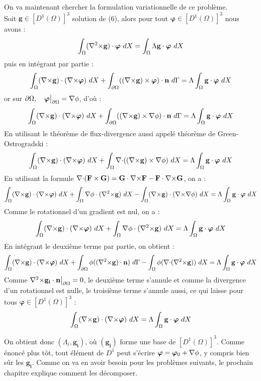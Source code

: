 On va maintenant chercher la formulation variationnelle de ce problème.\\
Soit $\mathbf{g}\in [D^1(\Omega)]^3$ solution de (6), alors pour tout $\bm{\varphi}\in [D^1(\Omega)]^3$ nous avons :
\[ \int_\Omega ({\nabla^2\times} \mathbf{g})\cdot\bm{\varphi}\ dX = \int_\Omega\Lambda \mathbf{g}\cdot\bm{\varphi}\ dX \]
puis en intégrant par partie :
\[ \int_\Omega ({\nabla\times} \mathbf{g})\cdot({\nabla\times}\bm{\varphi})\ dX + \int_{\partial\Omega} (({\nabla\times} \mathbf{g})\times \bm{\varphi})\cdot \mathbf{n}\ d\Gamma = \Lambda\int_\Omega \mathbf{g}\cdot\bm{\varphi}\ dX \]
or sur $\partial\Omega,\quad \bm{\varphi}{\big\rvert_{\partial\Omega}}={\nabla}\phi$, d'où :
\[ \int_\Omega ({\nabla\times} \mathbf{g})\cdot({\nabla\times}\bm{\varphi})\ dX + \int_{\partial\Omega} (({\nabla\times} \mathbf{g})\times {\nabla}\phi)\cdot \mathbf{n}\ d\Gamma = \Lambda\int_\Omega \mathbf{g}\cdot\bm{\varphi}\ dX \]
En utilisant le théorème de flux-divergence aussi appelé théorème de Green-Ostrogradski :
\[ \int_\Omega ({\nabla\times} \mathbf{g})\cdot({\nabla\times}\bm{\varphi})\ dX + \int_\Omega {\nabla\cdot}(({\nabla\times} \mathbf{g})\times {\nabla}\phi)\ dX = \Lambda\int_\Omega \mathbf{g}\cdot\bm{\varphi}\ dX \]
En utilisant la formule ${\nabla\cdot}(\mathbf{F}\times \mathbf{G}) = \mathbf{G}\cdot {\nabla\times} \mathbf{F} - \mathbf{F}\cdot {\nabla\times} \mathbf{G}$, on a :
\[ \int_\Omega (\rot \mathbf{g})\cdot(\rot\bm{\varphi})\ dX + \int_\Omega \grad\phi\cdot(\rott \mathbf{g})\ dX -\int_\Omega (\rot \mathbf{g})\cdot (\rot\grad\phi)\ dX  = \Lambda\int_\Omega \mathbf{g}\cdot\bm{\varphi}\ dX \]
Comme le rotationnel d'un gradient est nul, on a :
\[ \int_\Omega ({\nabla\times} \mathbf{g})\cdot({\nabla\times}\bm{\varphi})\ dX + \int_\Omega {\nabla}\phi\cdot({\nabla^2\times} \mathbf{g})\ dX  = \Lambda\int_\Omega \mathbf{g}\cdot\bm{\varphi}\ dX \]
En intégrant le deuxième terme par partie, on obtient :
\[ \int_\Omega ({\nabla\times} \mathbf{g})\cdot({\nabla\times}\bm{\varphi})\ dX + \int_{\partial\Omega} \phi(({\nabla^2\times} \mathbf{g})\cdot \mathbf{n})\ d\Gamma - \int_\Omega \phi({\nabla\cdot}({\nabla^2\times} \mathbf{g}))\ dX  = \Lambda\int_\Omega \mathbf{g}\cdot\bm{\varphi}\ dX \]
Comme ${\nabla^2\times}  \mathbf{g_i}\cdot \mathbf{n}{\big\rvert_{\partial\Omega}} = 0$, le deuxième terme s'annule et comme la divergence d'un rotationnel est nulle, le troisième terme s'annule aussi, ce qui laisse pour tous $\bm{\varphi}\in [D^1(\Omega)]^3$ :
\begin{equation}\label{fveigen}
\int_\Omega ({\nabla\times} \mathbf{g})\cdot({\nabla\times}\bm{\varphi})\ dX = \Lambda\int_\Omega \mathbf{g}\cdot\bm{\varphi}\ dX
\end{equation}

On obtient donc $(\Lambda_i,\mathbf{g_i})$, où $(\mathbf{g_i})$ forme une base de $[D^1(\Omega)]^3$. Comme énoncé plus tôt, tout élément de $D^1$ peut s'écrire $\bm{\varphi} = \bm{\varphi}_0 + {\nabla}\phi$, y compris bien sûr les $\mathbf{g_i}$. Comme on va en avoir besoin pour les problèmes suivants, le prochain chapitre explique comment les décomposer.

